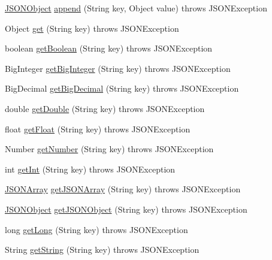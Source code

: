 \begin{DoxyCompactItemize}
\item 
\hyperlink{classorg_1_1json_1_1JSONObject}{J\-S\-O\-N\-Object} \hyperlink{classorg_1_1json_1_1JSONObject_ae6f06b948080a76425a818ebcfb2c001}{append} (String key, Object value)  throws J\-S\-O\-N\-Exception 
\item 
Object \hyperlink{classorg_1_1json_1_1JSONObject_ac98329762a354373a0d3fddc2855dd61}{get} (String key)  throws J\-S\-O\-N\-Exception 
\item 
boolean \hyperlink{classorg_1_1json_1_1JSONObject_ab40aab8de47233591ac4ad9d1b31adc0}{get\-Boolean} (String key)  throws J\-S\-O\-N\-Exception 
\item 
Big\-Integer \hyperlink{classorg_1_1json_1_1JSONObject_aa236e8c9ea6f66d366f962536f5b58b6}{get\-Big\-Integer} (String key)  throws J\-S\-O\-N\-Exception 
\item 
Big\-Decimal \hyperlink{classorg_1_1json_1_1JSONObject_aa4a743f61e251547b1edb81a6b8150f4}{get\-Big\-Decimal} (String key)  throws J\-S\-O\-N\-Exception 
\item 
double \hyperlink{classorg_1_1json_1_1JSONObject_abeec5fe03f3a260b7ec7a2b3076ca5ec}{get\-Double} (String key)  throws J\-S\-O\-N\-Exception 
\item 
float \hyperlink{classorg_1_1json_1_1JSONObject_a79ebc458b6a9617d0e3f5e606ef085d7}{get\-Float} (String key)  throws J\-S\-O\-N\-Exception 
\item 
Number \hyperlink{classorg_1_1json_1_1JSONObject_adb035aa00f7b0e60fcedc5a9268e47d2}{get\-Number} (String key)  throws J\-S\-O\-N\-Exception 
\item 
int \hyperlink{classorg_1_1json_1_1JSONObject_a3756c60c7c7bfecbdde3c3b5b1bcf385}{get\-Int} (String key)  throws J\-S\-O\-N\-Exception 
\item 
\hyperlink{classorg_1_1json_1_1JSONArray}{J\-S\-O\-N\-Array} \hyperlink{classorg_1_1json_1_1JSONObject_a884ee44fe958e9ea737d6c5e1180cb62}{get\-J\-S\-O\-N\-Array} (String key)  throws J\-S\-O\-N\-Exception 
\item 
\hyperlink{classorg_1_1json_1_1JSONObject}{J\-S\-O\-N\-Object} \hyperlink{classorg_1_1json_1_1JSONObject_a6011679cb15a3aac5944bb4a8af9f7fb}{get\-J\-S\-O\-N\-Object} (String key)  throws J\-S\-O\-N\-Exception 
\item 
long \hyperlink{classorg_1_1json_1_1JSONObject_a3547552ed2f4c5d415eab8202e8d6158}{get\-Long} (String key)  throws J\-S\-O\-N\-Exception 
\item 
String \hyperlink{classorg_1_1json_1_1JSONObject_a7140df2bac96f4d75a3f338ed16d1212}{get\-String} (String key)  throws J\-S\-O\-N\-Exception 

\end{DoxyCompactItemize}
